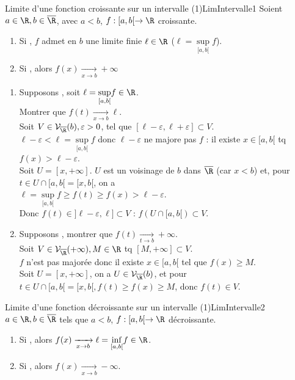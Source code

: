 \documentclass[12pt,a4paper]{report}
\begin{document}
\begin{theoreme}{Limite d'une fonction croissante sur un intervalle (1)}{LimIntervalle1}
Soient $a \in \R, b \in \overline{\R}$, avec $a<b$, $f : [a,b[ \to \R$ croissante.
\begin{enumerate}
	\item Si , $f$ admet en $b$ une limite finie $\ell \in \R$ ($\ell = \underset{[a,b[}{\sup} f$).
	\item Si , alors $f(x) \xrightarrow[x \to b]{} +\infty$
\end{enumerate}
\end{theoreme}

\begin{demo}{}
\begin{enumerate}
	\item Supposons , soit $\ell = \underset{[a,b[}{\sup} f \in \R$. \\
	Montrer que $f(t) \xrightarrow[x \to b]{} \ell$. \\
	Soit $V \in \mathcal{V}_{\overline{\R}}(b), \varepsilon >0$, tel que $[\ell-\varepsilon, \ell +\varepsilon] \subset V$. \\
	$\ell-\varepsilon < \ell = \underset{[a,b[}{\sup} f$ donc $\ell-\varepsilon$ ne majore pas $f$ : il existe $x \in [a,b[$ tq $f(x) > \ell-\varepsilon$. \\
	Soit $U = [x,+\infty]$. $U$ est un voisinage de $b$ dans $\overline{\R}$ (car $x<b$) et, pour $t \in U \cap [a,b[ = [x,b[$, on a \\
	$\ell = \underset{[a,b[}{\sup} f \geq f(t) \geq f(x) > \ell-\varepsilon$. \\
	Donc $f(t) \in ]\ell-\varepsilon,\ell] \subset V$ : $f(U \cap [a,b[) \subset V$.
	\item Supposons , montrer que $f(t) \xrightarrow[t \to b]{} +\infty$. \\
	Soit $V \in \mathcal{V}_{\overline{\R}}(+\infty), M \in \R$ tq $[M,+\infty] \subset V$. \\
	$f$ n'est pas majorée donc il existe $x \in [a,b[$ tel que $f(x) \geq M$. \\
	Soit $U = [x,+\infty]$, on a $U \in \mathcal{V}_{\overline{\R}}(b)$, et pour $t \in U \cap [a,b[ = [x,b[, f(t) \geq f(x) \geq M$, donc $f(t) \in V$.
\end{enumerate}
\end{demo}

\begin{corollaire}{Limite d'une fonction décroissante sur un intervalle (1)}{LimIntervalle2}
$a \in \R, b \in \overline{\R}$ tels que $a<b$, $f : [a,b[ \to \R$ décroissante.
\begin{enumerate}
	\item Si , alors $f(x) \xrightarrow[x \to b]{} \ell = \underset{[a,b[}{\inf} f \in \R$.
	\item Si , alors $f(x) \xrightarrow[x \to b]{} -\infty$.
\end{enumerate}
\end{corollaire}
\end{document}
